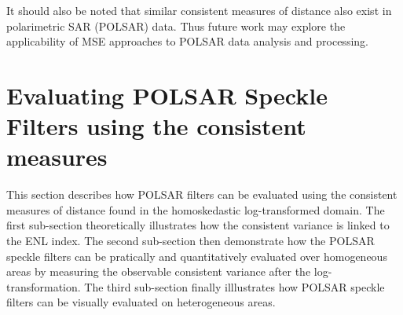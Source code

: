 It should also be noted that similar consistent measures of distance also exist in polarimetric SAR (POLSAR) data. 
Thus future work may explore the applicability of MSE approaches to POLSAR data analysis and processing.





\section{Evaluating POLSAR Speckle Filters using the consistent measures}

This section describes how POLSAR filters can be evaluated
  using the consistent measures of distance found in the homoskedastic log-transformed domain.
The first sub-section theoretically illustrates how the consistent variance is linked to the ENL index.
The second sub-section then demonstrate how the POLSAR speckle filters can be pratically and quantitatively evaluated over homogeneous areas by measuring the observable consistent variance after the log-transformation.
The third sub-section finally illlustrates how POLSAR speckle filters can be visually evaluated on heterogeneous areas.

